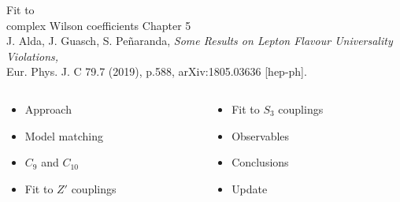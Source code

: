 \documentclass[mathserif, 10pt]{beamer}
\begin{document}
\begin{frame}[plain] %
\begin{block}{\Huge Fit to\\ complex Wilson coefficients}
    Chapter 5 \\
    {\color{red}J. Alda, J. Guasch, S. Peñaranda,
    \textit{Some Results on Lepton Flavour Universality Violations,}\\
    Eur. Phys. J. C 79.7 (2019), p.588, arXiv:1805.03636 [hep-ph].}

\end{block}

\vspace{0.5cm}

\begin{columns}
\begin{column}{0.48\textwidth}
        \begin{itemize}
            \item Approach
\item Model matching
            \item $C_9$ and $C_{10}$
            \item Fit to $Z'$ couplings

\end{itemize}
\end{column}
\begin{column}{0.48\textwidth}
\begin{itemize}
            \item Fit to $S_3$ couplings
            \item Observables
            \item Conclusions
\item Update
        \end{itemize}
\end{column}
\end{columns}


\end{frame}
\end{document}
